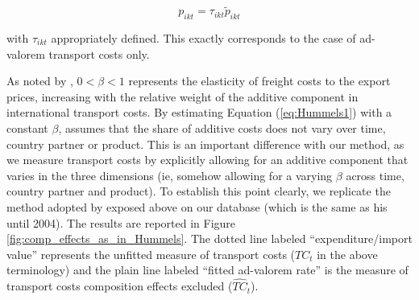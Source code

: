 \documentclass[a4paper,11pt]{article}
\begin{document}
$$p_{ikt} = \tau_{ikt} \widetilde{p}_{ikt}$$

\noindent with $\tau_{ikt}$ appropriately defined. This exactly corresponds to the case of ad-valorem transport costs only.


As noted by \cite{hummels_skiba}, $0<\beta<1$ represents the elasticity of freight costs to the export prices, increasing with the relative weight of the additive component in international transport costs. By estimating Equation (\ref{eq:Hummels1}) with a constant $\beta$, \cite{hummels2007} assumes that the share of additive costs does not vary over time, country partner or product. This is an important difference with our method, as we measure transport costs by explicitly allowing for an additive component that varies in the three dimensions (ie, somehow allowing for a varying $\beta$ across time, country partner and product). To establish this point clearly, we replicate the method adopted by \cite{hummels2007} exposed above on our database (which is the same as his until 2004). The results are reported in Figure \ref{fig:comp_effects_as_in_Hummels}. The dotted line labeled ``expenditure/import value'' represents the unfitted measure of transport costs ($TC_t$ in the above terminology) and the plain line labeled ``fitted ad-valorem rate'' is the measure of transport costs composition effects excluded ($\widehat{TC}_t$).
\end{document}
